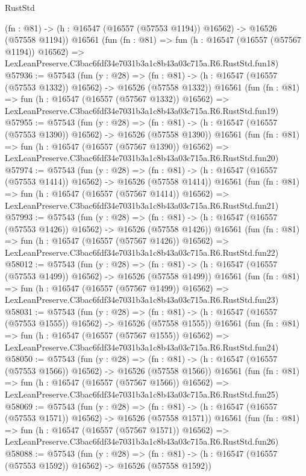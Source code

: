 \begin{lexlean}{RustStd}
\begin{coremodule}
    (fn : @81) -> (h : @16547 (@16557 (@57553 @1194)) @16562) -> @16526 (@57558 @1194))
    @16561
    (fun (fn : @81) =>
    fun (h : @16547 (@16557 (@57567 @1194)) @16562) =>
    LexLeanPreserve.C3bac6fdf34e7031b3a1c8b43a03c715a.R6.RustStd.fun18)
@57936 := @57543
    (fun (y : @28) =>
    (fn : @81) -> (h : @16547 (@16557 (@57553 @1332)) @16562) -> @16526 (@57558 @1332))
    @16561
    (fun (fn : @81) =>
    fun (h : @16547 (@16557 (@57567 @1332)) @16562) =>
    LexLeanPreserve.C3bac6fdf34e7031b3a1c8b43a03c715a.R6.RustStd.fun19)
@57955 := @57543
    (fun (y : @28) =>
    (fn : @81) -> (h : @16547 (@16557 (@57553 @1390)) @16562) -> @16526 (@57558 @1390))
    @16561
    (fun (fn : @81) =>
    fun (h : @16547 (@16557 (@57567 @1390)) @16562) =>
    LexLeanPreserve.C3bac6fdf34e7031b3a1c8b43a03c715a.R6.RustStd.fun20)
@57974 := @57543
    (fun (y : @28) =>
    (fn : @81) -> (h : @16547 (@16557 (@57553 @1414)) @16562) -> @16526 (@57558 @1414))
    @16561
    (fun (fn : @81) =>
    fun (h : @16547 (@16557 (@57567 @1414)) @16562) =>
    LexLeanPreserve.C3bac6fdf34e7031b3a1c8b43a03c715a.R6.RustStd.fun21)
@57993 := @57543
    (fun (y : @28) =>
    (fn : @81) -> (h : @16547 (@16557 (@57553 @1426)) @16562) -> @16526 (@57558 @1426))
    @16561
    (fun (fn : @81) =>
    fun (h : @16547 (@16557 (@57567 @1426)) @16562) =>
    LexLeanPreserve.C3bac6fdf34e7031b3a1c8b43a03c715a.R6.RustStd.fun22)
@58012 := @57543
    (fun (y : @28) =>
    (fn : @81) -> (h : @16547 (@16557 (@57553 @1499)) @16562) -> @16526 (@57558 @1499))
    @16561
    (fun (fn : @81) =>
    fun (h : @16547 (@16557 (@57567 @1499)) @16562) =>
    LexLeanPreserve.C3bac6fdf34e7031b3a1c8b43a03c715a.R6.RustStd.fun23)
@58031 := @57543
    (fun (y : @28) =>
    (fn : @81) -> (h : @16547 (@16557 (@57553 @1555)) @16562) -> @16526 (@57558 @1555))
    @16561
    (fun (fn : @81) =>
    fun (h : @16547 (@16557 (@57567 @1555)) @16562) =>
    LexLeanPreserve.C3bac6fdf34e7031b3a1c8b43a03c715a.R6.RustStd.fun24)
@58050 := @57543
    (fun (y : @28) =>
    (fn : @81) -> (h : @16547 (@16557 (@57553 @1566)) @16562) -> @16526 (@57558 @1566))
    @16561
    (fun (fn : @81) =>
    fun (h : @16547 (@16557 (@57567 @1566)) @16562) =>
    LexLeanPreserve.C3bac6fdf34e7031b3a1c8b43a03c715a.R6.RustStd.fun25)
@58069 := @57543
    (fun (y : @28) =>
    (fn : @81) -> (h : @16547 (@16557 (@57553 @1571)) @16562) -> @16526 (@57558 @1571))
    @16561
    (fun (fn : @81) =>
    fun (h : @16547 (@16557 (@57567 @1571)) @16562) =>
    LexLeanPreserve.C3bac6fdf34e7031b3a1c8b43a03c715a.R6.RustStd.fun26)
@58088 := @57543
    (fun (y : @28) =>
    (fn : @81) -> (h : @16547 (@16557 (@57553 @1592)) @16562) -> @16526 (@57558 @1592))

\end{coremodule}
\end{lexlean}
